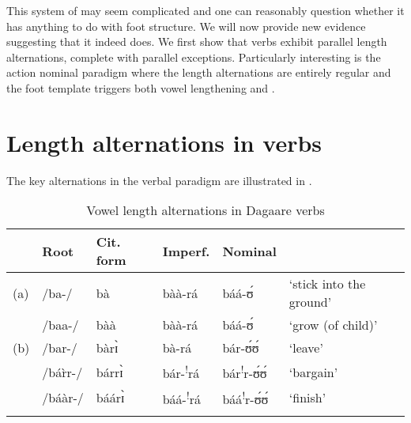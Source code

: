 \documentclass[output=paper,newtxmath,modfonts,nonflat,draftmode]{langsci/langscibook}
\begin{document}
{This system of  may seem complicated and one can reasonably question whether it has anything to do with foot structure. We will now provide new evidence suggesting that it indeed does. We first show that verbs exhibit parallel length alternations, complete with parallel exceptions. Particularly interesting is the action nominal paradigm where the length alternations are entirely regular and the foot template triggers both vowel lengthening and .}


\section{Length alternations in verbs}


{The key alternations in the verbal paradigm are illustrated in .}{} 

\begin{table}
\begin{tabularx}{\textwidth}{lllllX}
\lsptoprule
& {Root} & {Cit. form} & {Imperf.} & {Nominal} & \\
\midrule
(a) & /ba-/ & bà & bàà-rá & báá-ʊ́ & ‘stick into the ground’\\
& /baa-/ & bàà & bàà-rá & báá-ʊ́ & ‘grow (of child)’\\
\tablevspace
(b) & /bar-/ & bàrɪ̀ & bà-rá & bár-ʊ́ʊ́ & ‘leave’\\
& /bá\`{r}r-/ & bárrɪ̀ & bár-\textsuperscript{!}rá & bár\textsuperscript{!}r-ʊ́ʊ́ & ‘bargain’\\
& /báàr-/ & báárɪ̀ & báá-\textsuperscript{!}rá & báá\textsuperscript{!}r-ʊ́ʊ́ & ‘finish’\\
\lspbottomrule
\end{tabularx}
\caption{Vowel length alternations in Dagaare verbs}
\label{tab:anttila:5}
\end{table}
\end{document}
